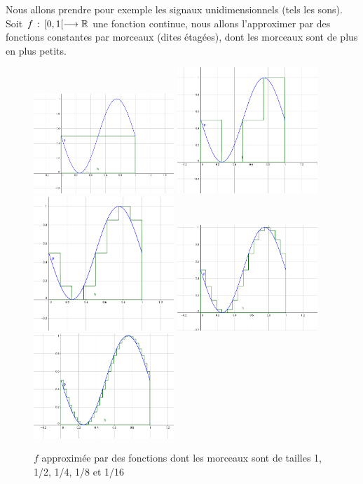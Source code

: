 	Nous allons prendre pour exemple les signaux unidimensionnels (tels les sons). Soit $f \, : \, [0, 1[ \longrightarrow \mathbb{R}$ une fonction continue, nous allons l'approximer par des fonctions constantes par morceaux (dites étagées), dont les morceaux sont de plus en plus petits.
	
	\begin{figure}[h]
		\label{sine-stairs}
		\centering
		\includegraphics[width=150pt]{Pierre/sin_1.png}
		\includegraphics[width=150pt]{Pierre/sin_2.png}
		\includegraphics[width=150pt]{Pierre/sin_4.png}
		\includegraphics[width=150pt]{Pierre/sin_8.png}
		\includegraphics[width=150pt]{Pierre/sin_16.png}
		\caption{$f$ approximée par des fonctions dont les morceaux sont de tailles 1, 1/2, 1/4, 1/8 et 1/16}
	\end{figure}
	
